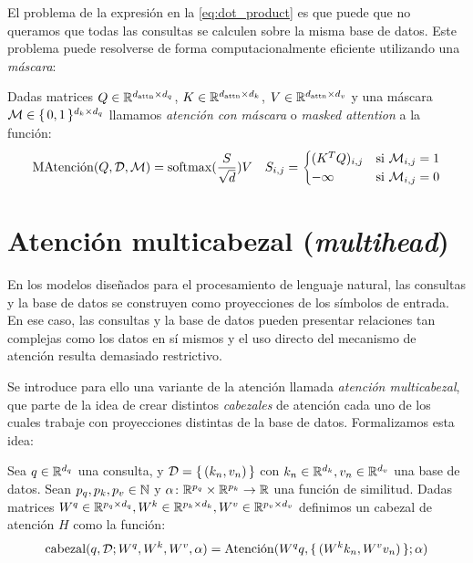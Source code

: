 El problema de la expresión en la \cref{eq:dot_product} es que puede que no queramos que todas las consultas se calculen sobre la misma base de datos. Este problema puede resolverse de forma computacionalmente eficiente utilizando una \textit{máscara}:
\begin{definition}
    Dadas matrices \( Q \in \mathbb{R}^{d_\text{attn} \times d_q}\), \(K \in \mathbb{R}^{d_\text{attn} \times d_k}\), \(V \in \mathbb{R}^{d_\text{attn} \times d_v}\) y una máscara \( \mathcal{M} \in \{\,0, 1\,\}^{d_k \times d_q}\) llamamos \textit{atención con máscara} o \textit{masked attention} a la función:
    \begin{align*}
        \operatorname{MAtenci\acute{o}n}(Q, \mathcal{D}, \mathcal{M}) = \operatorname{softmax}(\frac{S}{\sqrt{d}})V && S_{i, j} = \begin{cases}
            (K^TQ)_{i,j} & \text{si $\mathcal{M}_{i, j} = 1$} \\
            -\infty & \text{si $\mathcal{M}_{i, j} = 0$} 
        \end{cases}
    \end{align*}
\end{definition}


\section{Atención multicabezal (\textit{multihead})}
En los modelos diseñados para el procesamiento de lenguaje natural, las consultas y la base de datos se construyen como proyecciones de los símbolos de entrada. En ese caso, las consultas y la base de datos pueden presentar relaciones tan complejas como los datos en sí mismos y el uso directo del mecanismo de atención resulta demasiado restrictivo.

Se introduce para ello una variante de la atención llamada \textit{atención multicabezal}, que parte de la idea de crear distintos \textit{cabezales} de atención cada uno de los cuales trabaje con proyecciones distintas de la base de datos. Formalizamos esta idea:

\begin{definition}
    Sea \( q \in \mathbb{R}^{d_q} \) una consulta, y \( \mathcal{D} = \{\,(k_n, v_n)\,\} \) con \( k_n \in \mathbb{R}^{d_k}, v_n\in \mathbb{R}^{d_v} \) una base de datos. Sean \( p_q, p_k, p_v \in \mathbb{N} \) y \( \alpha \colon \mathbb{R}^{p_q} \times \mathbb{R}^{p_k} \to \mathbb{R} \) una función de similitud. Dadas matrices \( W^q \in \mathbb{R}^{p_q \times d_q}, W^k \in \mathbb{R}^{p_k \times d_k}, W^v \in \mathbb{R}^{p_v \times d_v} \) definimos un cabezal de atención \( H \) como la función:
    \begin{equation} \label{eq:head}
        \operatorname{cabezal}(q, \mathcal{D}; W^q, W^k, W^v, \alpha)  = \operatorname{Atenci\acute{o}n}(W^q q, \{\,(W^k k_n,  W^v v_n)\,\}; \alpha)
    \end{equation}
\end{definition}

